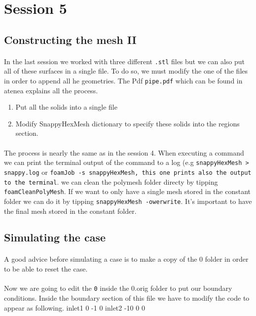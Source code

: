 \lstset{language=C}
\section{Session 5}
\subsection{Constructing the mesh II}
\paragraph{}In the last session we worked with three different \texttt{.stl} files but we can also put all of these surfaces in a single file. To do so, we must modify the one of the files in order to append all he geometries. The Pdf \texttt{pipe.pdf} which can be found in atenea explains all the process.
\begin{enumerate}
	\item Put all the solids into a single file
	\item Modify SnappyHexMesh dictionary to specify these solids 	into the regions section.
\end{enumerate}
\paragraph{}The process is nearly the same as in the session 4. When executing a command we can print the terminal output of the command to a log (e.g \texttt{snappyHexMesh > snappy.log} or \texttt{foamJob -s snappyHexMesh, this one prints also the output to the terminal}. we can clean the polymesh folder directy by tipping \texttt{foamCleanPolyMesh}. If we want to only have a single mesh stored in the constant folder we can do it by tipping \texttt{snappyHexMesh -owerwrite}. It's important to have the final mesh stored in the constant folder.

\subsection{Simulating the case}
\paragraph{}A good advice before simulating a case is to make a copy of the 0 folder in order to be able to reset the case.

\paragraph{}Now we are going to edit the \texttt{0} inside the 0.orig folder to put our boundary conditions. Inside the boundary section of this file we have to modify the code to appear as following.
inlet1 0 -1 0
inlet2 -10 0 0

